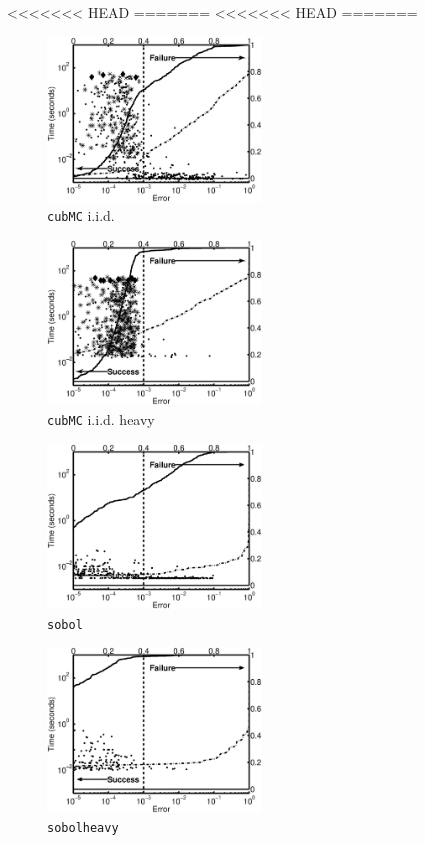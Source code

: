 \documentclass[graybox]{svmult}
\begin{document}
<<<<<<< HEAD
=======
<<<<<<< HEAD
=======
\begin{figure}
\centering
\begin{minipage}{5.7cm} \centering \includegraphics[width=5.7cm]{gaussiand=1iidErrTime.eps} \\ {\tt cubMC} i.i.d. \end{minipage}
\begin{minipage}{5.7cm} \centering \includegraphics[width=5.7cm]{gaussiand=1iidheavyErrTime.eps} \\ {\tt cubMC} i.i.d. heavy \end{minipage}
\begin{minipage}{5.7cm} \centering \includegraphics[width=5.7cm]{gaussiand=1SobolErrTime.eps} \\ {\tt sobol} \end{minipage}
\begin{minipage}{5.7cm} \centering \includegraphics[width=5.7cm]{gaussiand=1SobolheavyErrTime.eps} \\ {\tt sobolheavy} \end{minipage}

\end{figure}
\end{document}
